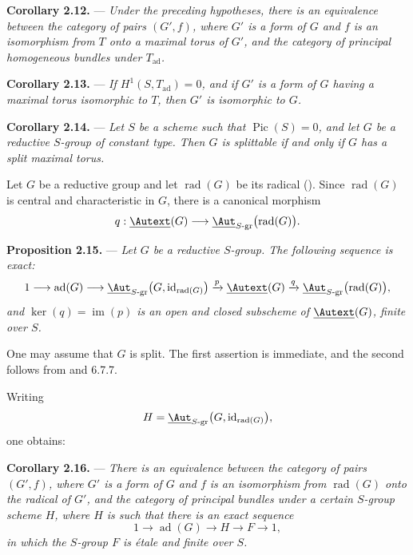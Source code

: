 \medskip\noindent\textbf{Corollary 2.12.} ---
{\itshape Under the preceding hypotheses, there is an equivalence
between the category of pairs \((G',f)\), where \(G'\) is a form of
\(G\) and \(f\) is an isomorphism from \(T\) onto a maximal torus of
\(G'\), and the category of principal homogeneous bundles under
\(T_{\mathrm{ad}}\).}

\medskip\noindent\textbf{Corollary 2.13.} ---
{\itshape If \(H^1(S,T_{\mathrm{ad}})=0\), and if \(G'\) is a form of
\(G\) having a maximal torus isomorphic to \(T\), then \(G'\) is
isomorphic to \(G\).}

\medskip\noindent\textbf{Corollary 2.14.} ---
{\itshape Let \(S\) be a scheme such that \(\operatorname{Pic}(S)=0\),
and let \(G\) be a reductive \(S\)-group of constant type. Then \(G\)
is splittable if and only if \(G\) has a split maximal torus.}

Let \(G\) be a reductive group and let
\(\operatorname{rad}(G)\) be its radical ().
Since \(\operatorname{rad}(G)\) is central and characteristic in
\(G\), there is a canonical morphism
\[
  q:\underline{\Autext}(G)
  \longrightarrow
  \underline{\Aut}_{S\text{-}\mathrm{gr}}
    \bigl(\operatorname{rad}(G)\bigr).
\]


\medskip\noindent\textbf{Proposition 2.15.} ---
{\itshape Let \(G\) be a reductive \(S\)-group. The following sequence
is exact:}
\[
  1\longrightarrow
  \operatorname{ad}(G)
  \longrightarrow
  \underline{\Aut}_{S\text{-}\mathrm{gr}}
    \bigl(G,\operatorname{id}_{\operatorname{rad}(G)}\bigr)
  \xrightarrow{p}
  \underline{\Autext}(G)
  \xrightarrow{q}
  \underline{\Aut}_{S\text{-}\mathrm{gr}}
    \bigl(\operatorname{rad}(G)\bigr),
\]
{\itshape and \(\ker(q)=\operatorname{im}(p)\) is an open and closed
subscheme of \(\underline{\Autext}(G)\), finite over \(S\).}

One may assume that \(G\) is split. The first assertion is immediate,
and the second follows from  and 6.7.7.

Writing
\[
  H=
  \underline{\Aut}_{S\text{-}\mathrm{gr}}
    \bigl(G,\operatorname{id}_{\operatorname{rad}(G)}\bigr),
\]
one obtains:

\medskip\noindent\textbf{Corollary 2.16.} ---
{\itshape There is an equivalence between the category of pairs
\((G',f)\), where \(G'\) is a form of \(G\) and \(f\) is an
isomorphism from \(\operatorname{rad}(G)\) onto the radical of \(G'\),
and the category of principal bundles under a certain \(S\)-group
scheme \(H\), where \(H\) is such that there is an exact sequence}
\[
  1\longrightarrow \operatorname{ad}(G)
  \longrightarrow H
  \longrightarrow F
  \longrightarrow 1,
\]
{\itshape in which the \(S\)-group \(F\) is étale and finite over
\(S\).}

